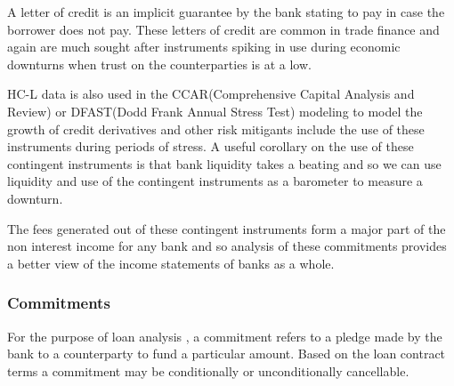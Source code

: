 \documentclass[conference]{IEEEtran}
\begin{document}
    A letter of credit is an implicit guarantee by the bank stating to pay in case the borrower does not pay. These letters of credit are common in trade finance and again are much sought after instruments spiking in use during economic downturns when trust on the counterparties is at a low.
    
    HC-L data is also used in the CCAR(Comprehensive Capital Analysis and Review) or DFAST(Dodd Frank Annual Stress Test) modeling to model the growth of credit derivatives and other risk mitigants include the use of these instruments during periods of stress. A useful corollary on the use of these contingent instruments is that bank liquidity takes a beating and so we can use liquidity and use of the contingent instruments as a barometer to measure a downturn.
    
    The fees generated out of these contingent instruments form a major part of the non interest income for any bank and so analysis of these commitments provides a better view of the income statements of banks as a whole.
    
    \subsubsection{Commitments}
         For the purpose of loan analysis , a commitment refers to a pledge made by the bank to a counterparty to fund a particular amount. Based on the loan contract terms a commitment may be conditionally or unconditionally cancellable.  
         
\end{document}
